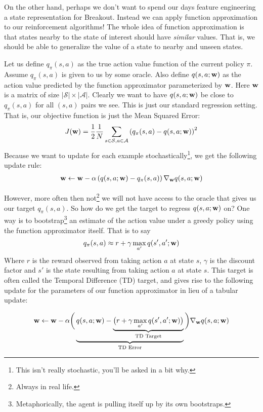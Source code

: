 On the other hand, perhaps we don't want to spend our days feature engineering a state representation for Breakout. Instead we can apply function approximation to our reinforcement algorithms! The whole idea of function approximation is that states nearby to the state of interest should have \emph{similar} values. That is, we should be able to generalize the value of a state to nearby and unseen states.

Let us define $q_\pi(s, a)$ as the true action value function of the current policy $\pi$. Assume $q_\pi(s,a)$ is given to us by some oracle. Also define $q(s, a; \mathbf{w})$ as the action value predicted by the function approximator parameterized by $\mathbf{w}$. Here $\mathbf{w}$ is a matrix of size $|\mathcal{S}| \times |\mathcal{A}|$. Clearly we want to have $q(s, a; \mathbf{w})$ be close to $q_\pi(s, a)$ for all $(s, a)$ pairs we see. This is just our standard regression setting. That is, our objective function is just the Mean Squared Error:
\begin{align}
J(\mathbf{w}) = \frac{1}{2} \frac{1}{N} \sum_{s\in\mathcal{S}, a\in\mathcal{A}} \left(q_\pi(s, a) - q(s, a; \mathbf{w}) \right)^2
\end{align}
Because we want to update for each example stochastically\footnote{This isn't really stochastic, you'll be asked in a bit why.}, we get the following update rule:
\begin{align}
\mathbf{w} \leftarrow \mathbf{w} - \alpha \left(q(s, a; \mathbf{w}) - q_\pi(s,a) \right) \nabla_{\mathbf{w}} q(s, a; \mathbf{w})
\end{align}

However, more often then not\footnote{Always in real life.} we will not have access to the oracle that gives us our target $q_\pi(s, a)$. So how do we get the target to regress $q(s, a; \mathbf{w})$ on? One way is to bootstrap\footnote{Metaphorically, the agent is pulling itself up by its own bootstraps.} an estimate of the action value under a greedy policy using the function approximator itself. That is to say
\begin{align}
q_\pi (s, a) \approx r + \gamma \max_{a'} q(s', a'; \mathbf{w})
\end{align}
Where $r$ is the reward observed from taking action $a$ at state $s$, $\gamma$ is the discount factor and $s'$ is the state resulting from taking action $a$ at state $s$. This target is often called the Temporal Difference (TD) target, and gives rise to the following update for the parameters of our function approximator in lieu of a tabular update:

\begin{align}
\mathbf{w} \leftarrow \mathbf{w} - \alpha \bigg( \underbrace{q(s, a; \mathbf{w}) - \underbrace{\big (r + \gamma \max_{a'}q(s', a'; \mathbf{w})\big)}_{\text{TD Target}}}_{\text{TD Error}} \bigg) \nabla_{\mathbf{w}} q(s, a; \mathbf{w})
\end{align}

